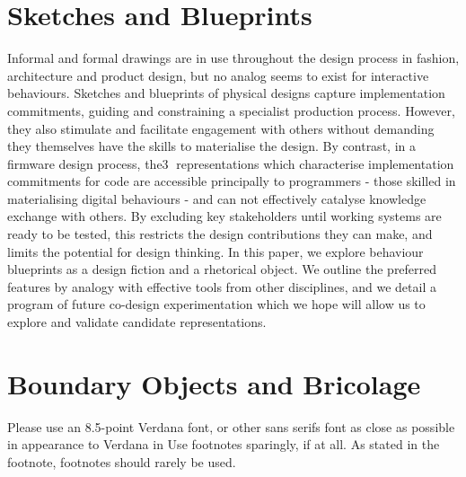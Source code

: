\documentclass{chi-ext}
\begin{document}
\section{Sketches and Blueprints}
Informal and formal drawings are in use throughout the design process in fashion, architecture and product design, but no analog seems to exist for interactive behaviours. Sketches and blueprints of physical designs capture implementation commitments, guiding and constraining a specialist production process. However, they also stimulate and facilitate engagement with others without demanding they themselves have the skills to materialise the design. By contrast, in a firmware design process, the3 representations which characterise implementation commitments for code are accessible principally to programmers - those skilled in materialising digital behaviours - and can not effectively catalyse knowledge exchange with others. By excluding key stakeholders until working systems are ready to be tested, this restricts the design contributions they can make, and limits the potential for design thinking. In this paper, we explore behaviour blueprints as a design fiction and a rhetorical object. We outline the preferred features by analogy with effective tools from other disciplines, and we detail a program of future co-design experimentation which we hope will allow us to explore and validate candidate representations.

\section{Boundary Objects and Bricolage}
Please use an 8.5-point Verdana font, or other sans serifs font as close as possible in appearance to Verdana in {Use footnotes sparingly, if at all.}
As stated in the footnote, footnotes should rarely be used.

\end{document}
